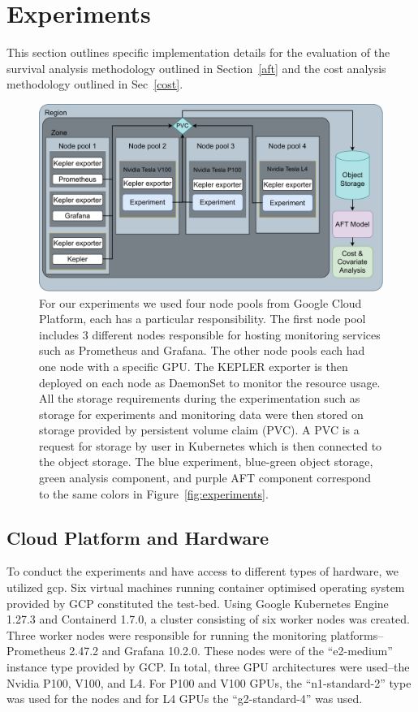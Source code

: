 \documentclass[sn-mathphys-num]{sn-jnl}%
\begin{document}
\section{Experiments}
\label{experiments}

This section outlines specific implementation details for the evaluation of the survival analysis methodology outlined in Section~\ref{aft} and the cost analysis methodology outlined in Sec~\ref{cost}.


\begin{figure}
    \centering
    \includegraphics[width=.9\textwidth]{plots/architecture.pdf}
    \caption{
    For our experiments we used four node pools from Google Cloud Platform, each has a particular responsibility.
    The first node pool includes 3 different nodes responsible for hosting monitoring services such as Prometheus and Grafana.
    The other node pools each had one node with a specific GPU\@.
    The KEPLER exporter is then deployed on each node as DaemonSet to monitor the resource usage.
    All the storage requirements during the experimentation such as storage for experiments and monitoring data were then stored on storage provided by persistent volume claim (PVC).
    A PVC is a request for storage by user in Kubernetes which is then connected to the object storage.
    The blue experiment, blue-green object storage, green analysis component, and purple AFT component correspond to the same colors in Figure~\ref{fig:experiments}.}
    \label{fig:architecture}
\end{figure}



\subsection{Cloud Platform and Hardware}
To conduct the experiments and have access to different types of hardware, we utilized \acrshort{gcp}\@.
Six virtual machines running container optimised operating system provided by GCP constituted the test-bed.
Using Google Kubernetes Engine 1.27.3 and Containerd 1.7.0, a cluster consisting of six worker nodes was created.
Three worker nodes were responsible for running the monitoring platforms-- Prometheus 2.47.2 and Grafana 10.2.0.
These nodes were of the ``e2-medium'' instance type provided by GCP\@.
In total, three GPU architectures were used--the Nvidia P100, V100, and L4\@.
For P100 and V100 GPUs, the ``n1-standard-2'' type was used for the nodes and for L4 GPUs the ``g2-standard-4'' was used.
\end{document}
